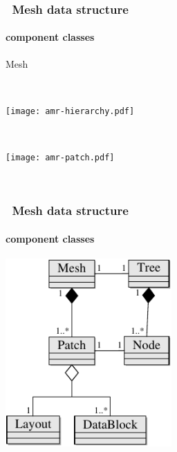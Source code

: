 \begin{frame}[fragile] 
\frametitle{\cello\ Mesh data structure}
\framesubtitle{ component classes}
\begin{center}
\begin{minipage}{2.2in}
\centerline{ Mesh} \ \\
\centerline{\texttt{[image: amr-hierarchy.pdf]}}
\end{minipage} \ \\ \vspace{0.1in}
\begin{minipage}{2.2in}
\centerline{\texttt{[image: amr-patch.pdf]}}
\end{minipage} \ \\
\end{center}
\end{frame}

\begin{frame}[fragile] 
\frametitle{\cello\ Mesh data structure}
\framesubtitle{ component classes}
\centerline{\includegraphics[width=2.5in]{uml/amr.pdf}}

\end{frame}

